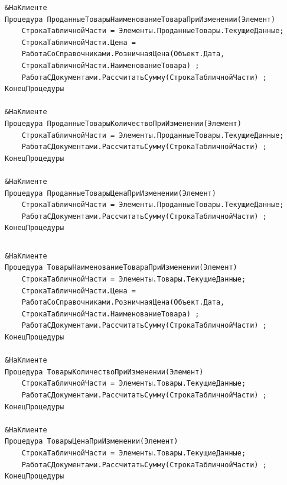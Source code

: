 \documentclass[12pt,a4paper]{article}
\begin{document}
\begin{appendices}
\begin{lstlisting}[caption=Пересчет суммы и подстановка цен на товары (Накладная на продажу)]
\end{lstlisting}

\begin{verbatim}
&НаКлиенте
Процедура ПроданныеТоварыНаименованиеТовараПриИзменении(Элемент)
    СтрокаТабличнойЧасти = Элементы.ПроданныеТовары.ТекущиеДанные;
    СтрокаТабличнойЧасти.Цена =
    РаботаСоСправочниками.РозничнаяЦена(Объект.Дата,
    СтрокаТабличнойЧасти.НаименованиеТовара) ;
    РаботаСДокументами.РассчитатьСумму(СтрокаТабличнойЧасти) ;
КонецПроцедуры

&НаКлиенте
Процедура ПроданныеТоварыКоличествоПриИзменении(Элемент)
    СтрокаТабличнойЧасти = Элементы.ПроданныеТовары.ТекущиеДанные;
    РаботаСДокументами.РассчитатьСумму(СтрокаТабличнойЧасти) ;
КонецПроцедуры

&НаКлиенте
Процедура ПроданныеТоварыЦенаПриИзменении(Элемент)
    СтрокаТабличнойЧасти = Элементы.ПроданныеТовары.ТекущиеДанные;
    РаботаСДокументами.РассчитатьСумму(СтрокаТабличнойЧасти) ;
КонецПроцедуры
\end{verbatim}

\begin{lstlisting}[caption=Пересчет суммы и подстановка цен на товары (Возвратная накладная)]
\end{lstlisting}

\begin{verbatim}
&НаКлиенте
Процедура ТоварыНаименованиеТовараПриИзменении(Элемент)
    СтрокаТабличнойЧасти = Элементы.Товары.ТекущиеДанные;
    СтрокаТабличнойЧасти.Цена =
    РаботаСоСправочниками.РозничнаяЦена(Объект.Дата,
    СтрокаТабличнойЧасти.НаименованиеТовара) ;
    РаботаСДокументами.РассчитатьСумму(СтрокаТабличнойЧасти) ;
КонецПроцедуры

&НаКлиенте
Процедура ТоварыКоличествоПриИзменении(Элемент)
    СтрокаТабличнойЧасти = Элементы.Товары.ТекущиеДанные;
    РаботаСДокументами.РассчитатьСумму(СтрокаТабличнойЧасти) ;
КонецПроцедуры

&НаКлиенте
Процедура ТоварыЦенаПриИзменении(Элемент)
    СтрокаТабличнойЧасти = Элементы.Товары.ТекущиеДанные;
    РаботаСДокументами.РассчитатьСумму(СтрокаТабличнойЧасти) ;
КонецПроцедуры
\end{verbatim}

\begin{lstlisting}[caption=Модуль формы документа Накладная по истечению срока хранения]
\end{lstlisting}


\end{appendices}
\end{document}
